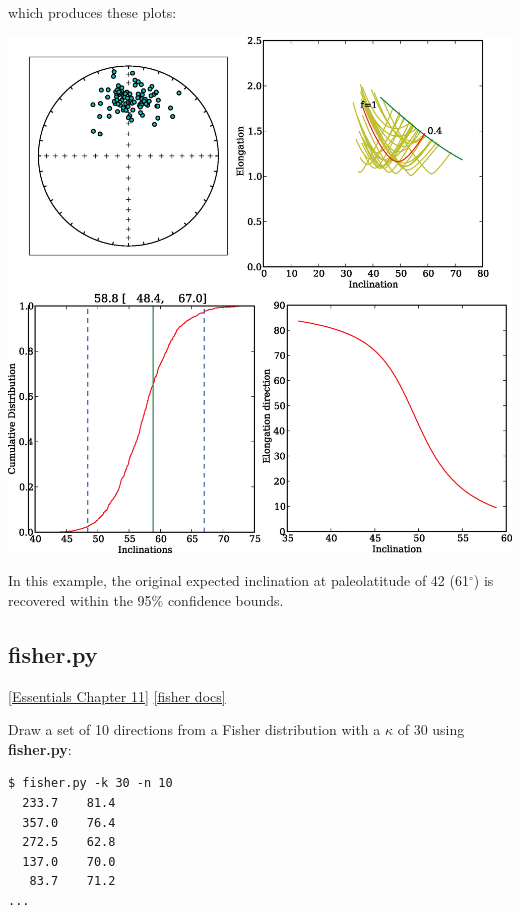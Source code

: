 \documentclass[11pt]{book}
\begin{document}
{{\begin{verbatim}
\end{verbatim}

\noindent which produces these plots:



\includegraphics[width=15cm]{EPSfiles/find_EI.eps}

In this example, the original expected inclination at paleolatitude of 42 (61$^{\circ}$) is recovered within the 95\% confidence bounds.

%

\subsection{fisher.py}
\href{http://earthref.org/MAGIC/books/Tauxe/Essentials/WebBook3ch11.html#ch11}{ [Essentials Chapter 11]}
\href{https://github.com/PmagPy/PmagPy/blob/master/programs/fisher.py}{[fisher docs]}

Draw a set of 10 directions from a Fisher distribution with a $\kappa$ of 30 using {\bf fisher.py}:

\begin{verbatim}
$ fisher.py -k 30 -n 10
  233.7    81.4
  357.0    76.4
  272.5    62.8
  137.0    70.0
   83.7    71.2
...
  \end{verbatim}

}}
\end{document}
